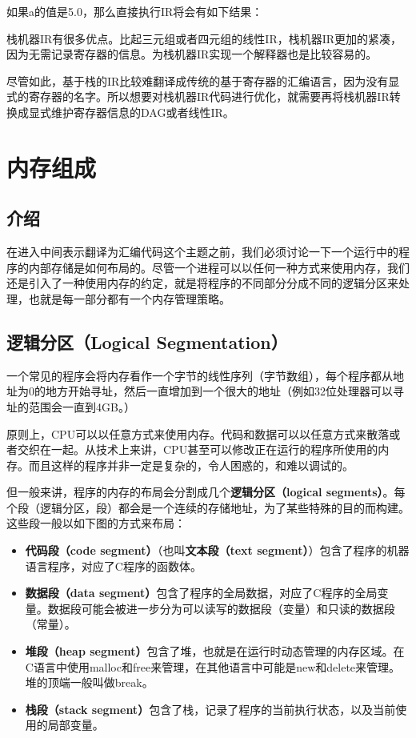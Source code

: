 \documentclass[cn,11pt,chinese]{elegantbook}
\begin{document}
如果a的值是5.0，那么直接执行IR将会有如下结果：

栈机器IR有很多优点。比起三元组或者四元组的线性IR，栈机器IR更加的紧凑，因为无需记录寄存器的信息。为栈机器IR实现一个解释器也是比较容易的。

尽管如此，基于栈的IR比较难翻译成传统的基于寄存器的汇编语言，因为没有显式的寄存器的名字。所以想要对栈机器IR代码进行优化，就需要再将栈机器IR转换成显式维护寄存器信息的DAG或者线性IR。

\chapter{内存组成}

\section{介绍}

在进入中间表示翻译为汇编代码这个主题之前，我们必须讨论一下一个运行中的程序的内部存储是如何布局的。尽管一个进程可以以任何一种方式来使用内存，我们还是引入了一种使用内存的约定，就是将程序的不同部分分成不同的逻辑分区来处理，也就是每一部分都有一个内存管理策略。

\section{逻辑分区（Logical Segmentation）}

一个常见的程序会将内存看作一个字节的线性序列（字节数组），每个程序都从地址为0的地方开始寻址，然后一直增加到一个很大的地址（例如32位处理器可以寻址的范围会一直到4GB。）

原则上，CPU可以以任意方式来使用内存。代码和数据可以以任意方式来散落或者交织在一起。从技术上来讲，CPU甚至可以修改正在运行的程序所使用的内存。而且这样的程序并非一定是复杂的，令人困惑的，和难以调试的。

但一般来讲，程序的内存的布局会分割成几个\textbf{逻辑分区（logical segments）}。每个段（逻辑分区，段）都会是一个连续的存储地址，为了某些特殊的目的而构建。这些段一般以如下图的方式来布局：

\begin{itemize}
  \item \textbf{代码段（code segment）}（也叫\textbf{文本段（text segment）}）包含了程序的机器语言程序，对应了C程序的函数体。
  \item \textbf{数据段（data segment）}包含了程序的全局数据，对应了C程序的全局变量。数据段可能会被进一步分为可以读写的数据段（变量）和只读的数据段（常量）。
  \item \textbf{堆段（heap segment）}包含了堆，也就是在运行时动态管理的内存区域。在C语言中使用malloc和free来管理，在其他语言中可能是new和delete来管理。堆的顶端一般叫做break。
  \item \textbf{栈段（stack segment）}包含了栈，记录了程序的当前执行状态，以及当前使用的局部变量。
\end{itemize}
\end{document}
